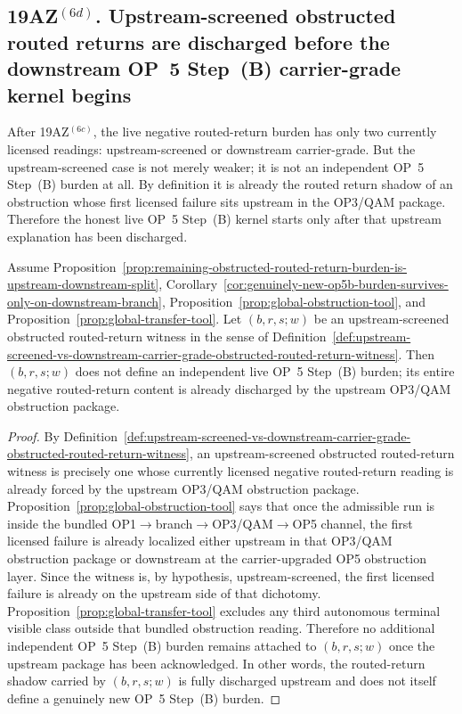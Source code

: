 \subsection*{19AZ$^{(6d)}$. Upstream-screened obstructed routed returns are discharged before the downstream OP~5 Step~(B) carrier-grade kernel begins}
\label{sec:upstream-screened-obstructed-routed-returns-discharged-before-downstream-op5b-kernel}
After 19AZ$^{(6c)}$, the live negative routed-return burden has only two currently licensed readings: upstream-screened or downstream carrier-grade. But the upstream-screened case is not merely weaker; it is not an independent OP~5 Step~(B) burden at all. By definition it is already the routed return shadow of an obstruction whose first licensed failure sits upstream in the OP3/QAM package. Therefore the honest live OP~5 Step~(B) kernel starts only after that upstream explanation has been discharged.

\begin{proposition}
\label{prop:upstream-screened-obstructed-routed-return-witnesses-do-not-define-independent-op5b-burden}
Assume Proposition~\ref{prop:remaining-obstructed-routed-return-burden-is-upstream-downstream-split}, Corollary~\ref{cor:genuinely-new-op5b-burden-survives-only-on-downstream-branch}, Proposition~\ref{prop:global-obstruction-tool}, and Proposition~\ref{prop:global-transfer-tool}. Let $(b,r,s;w)$ be an upstream-screened obstructed routed-return witness in the sense of Definition~\ref{def:upstream-screened-vs-downstream-carrier-grade-obstructed-routed-return-witness}. Then $(b,r,s;w)$ does not define an independent live OP~5 Step~(B) burden; its entire negative routed-return content is already discharged by the upstream OP3/QAM obstruction package.
\end{proposition}

\begin{proof}
By Definition~\ref{def:upstream-screened-vs-downstream-carrier-grade-obstructed-routed-return-witness}, an upstream-screened obstructed routed-return witness is precisely one whose currently licensed negative routed-return reading is already forced by the upstream OP3/QAM obstruction package. Proposition~\ref{prop:global-obstruction-tool} says that once the admissible run is inside the bundled OP1$\to$branch$\to$OP3/QAM$\to$OP5 channel, the first licensed failure is already localized either upstream in that OP3/QAM obstruction package or downstream at the carrier-upgraded OP5 obstruction layer. Since the witness is, by hypothesis, upstream-screened, the first licensed failure is already on the upstream side of that dichotomy. Proposition~\ref{prop:global-transfer-tool} excludes any third autonomous terminal visible class outside that bundled obstruction reading. Therefore no additional independent OP~5 Step~(B) burden remains attached to $(b,r,s;w)$ once the upstream package has been acknowledged. In other words, the routed-return shadow carried by $(b,r,s;w)$ is fully discharged upstream and does not itself define a genuinely new OP~5 Step~(B) burden.
\end{proof}

